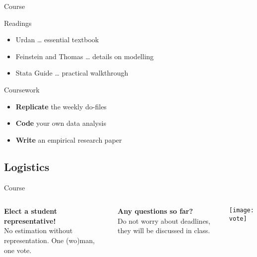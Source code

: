 \documentclass[t]{beamer}
\begin{document}
  \begin{frame}[t]{Course }

    
    \begin{block}{Readings}
      \begin{itemize}
        \item Urdan 								\hfill … essential textbook
        \item Feinstein and Thomas  \hfill … details on modelling
        \item Stata Guide           \hfill … practical walkthrough
      \end{itemize} 
    \end{block}
  
    \begin{block}{Coursework}
      \begin{itemize}
          \item \textbf{Replicate} the weekly do-files
          \item \textbf{Code} your own data analysis
          \item \textbf{Write} an empirical research paper
      \end{itemize} 
    \end{block}
    
  \end{frame}
  
  \subsection{Logistics}
	
  \begin{frame}[t]{Course }

    \begin{columns}[T]

      
        \textbf{Elect a student representative!}\\[1em]

        No estimation without representation. One (wo)man, one vote.\vspace{1em}
      
        \textbf{Any questions so far?}\\[1em]
      
        Do not worry about deadlines, they will be discussed in class.


        \texttt{[image: vote]}

    \end{columns}   

  \end{frame}
  
\end{document}
